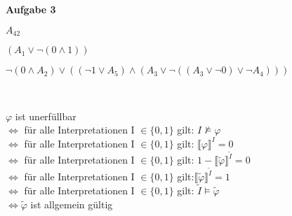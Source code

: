 \documentclass[a4paper,10pt]{article}
\begin{document}
	\newpage
	\textbf{Aufgabe 3}
	\begin{compactenum} [(a)]
		\item 
		\begin{compactenum} [(i)]
			\item $ A_{42} $
			\item $ (A_1 \vee \lnot (0 \wedge 1)) $
			\item $ \lnot (0 \wedge A_2) \vee ((\lnot 1 \vee A_5) \wedge (A_3 \vee \lnot ((A_3 \vee \lnot 0) \vee \lnot A_4))) $
		\end{compactenum}\ \\
		\item $ \varphi $ ist unerfüllbar \\
		$ \Leftrightarrow $ für alle Interpretationen I $ \in \{0,1\} $ gilt: $ I\not\models \varphi$ \\
		$ \Leftrightarrow $ für alle Interpretationen I $ \in \{0,1\} $ gilt: $ \llbracket\varphi\rrbracket ^I = 0$ \\
		$ \Leftrightarrow $ für alle Interpretationen I $ \in \{0,1\} $ gilt: $ 1-\llbracket\tilde{\varphi}\rrbracket^{\tilde{I}} = 0 $ \\
		$ \Leftrightarrow $ für alle Interpretationen I $ \in \{0,1\} $ gilt:$ \llbracket\tilde{\varphi}\rrbracket^{\tilde{I}} = 1 $ \\
		$ \Leftrightarrow $ für alle Interpretationen I $ \in \{0,1\} $ gilt: $ \tilde{I} \models \tilde{\varphi} $ \\
		$ \Leftrightarrow \tilde{\varphi} $ ist allgemein gültig 
			


\end{compactenum}
\end{document}
